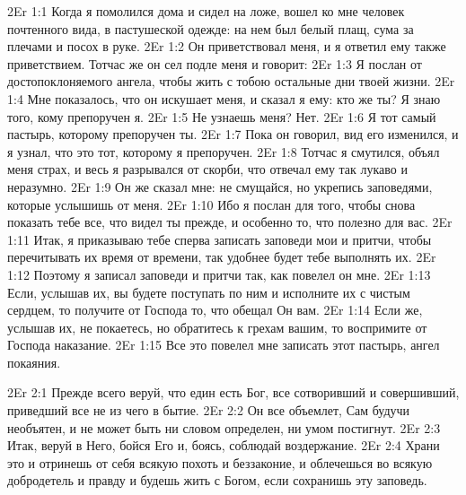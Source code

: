\vs 2Er 1:1
Когда я
помолился дома и сидел на ложе, вошел ко мне человек почтенного вида, в
пастушеской одежде: на нем был белый плащ, сума за плечами и посох в руке.
\vs 2Er 1:2
Он приветствовал меня, и я
ответил ему также приветствием. Тотчас же он сел подле меня и говорит:
\vs 2Er 1:3
Я послан от
достопоклоняемого ангела, чтобы жить с тобою остальные дни твоей жизни.
\vs 2Er 1:4
Мне показалось, что он
искушает меня, и сказал я ему: кто же ты? Я знаю того, кому препоручен я.
\vs 2Er 1:5
Не узнаешь меня? Нет.
\vs 2Er 1:6
Я тот самый пастырь,
которому препоручен ты.
\vs 2Er 1:7
Пока он говорил, вид его
изменился, и я узнал, что это тот, которому я препоручен.
\vs 2Er 1:8
Тотчас я смутился, объял
меня страх, и весь я разрывался от скорби, что отвечал ему так лукаво и
неразумно.
\vs 2Er 1:9
Он же сказал мне: не
смущайся, но укрепись заповедями, которые услышишь от меня.
\vs 2Er 1:10
Ибо я послан для того,
чтобы снова показать тебе все, что видел ты прежде, и особенно то, что полезно
для вас.
\vs 2Er 1:11
Итак, я приказываю тебе
сперва записать заповеди мои и притчи, чтобы перечитывать их время от времени,
так удобнее будет тебе выполнять их.
\vs 2Er 1:12
Поэтому я записал
заповеди и притчи так, как повелел он мне.
\vs 2Er 1:13
Если, услышав их, вы
будете поступать по ним и исполните их с чистым сердцем, то получите от
Господа то, что обещал Он вам.
\vs 2Er 1:14
Если же, услышав их, не
покаетесь, но обратитесь к грехам вашим, то воспримите от Господа наказание.
\vs 2Er 1:15
Все это повелел мне
записать этот пастырь, ангел покаяния.
 
\vs 2Er 2:1
Прежде
всего веруй, что един есть Бог, все сотворивший и совершивший, приведший все
не из чего в бытие.
\vs 2Er 2:2
Он все объемлет, Сам
будучи необъятен, и не может быть ни словом определен, ни умом постигнут.
\vs 2Er 2:3
Итак, веруй в Него, бойся
Его и, боясь, соблюдай воздержание.
\vs 2Er 2:4
Храни это и отринешь от
себя всякую похоть и беззаконие, и облечешься во всякую добродетель и правду и
будешь жить с Богом, если сохранишь эту заповедь.

